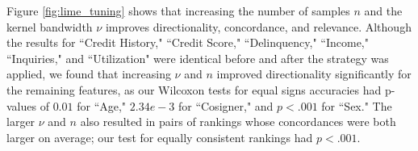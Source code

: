 \documentclass[12pt]{article}  %
\begin{document}
            Figure \ref{fig:lime_tuning} shows that increasing the number of samples $n$ and the kernel bandwidth $\nu$ improves directionality, concordance, and relevance. Although the results for ``Credit History," ``Credit Score," ``Delinquency," ``Income," ``Inquiries," and ``Utilization" were identical before and after the strategy was applied, we found that increasing $\nu$ and $n$ improved directionality  significantly for the remaining features, as our Wilcoxon tests for equal signs accuracies had p-values of $0.01$ for ``Age," $2.34e-3$ for ``Cosigner," and $p<.001$ for ``Sex." The larger $\nu$ and $n$ also resulted in pairs of rankings whose concordances were both larger on average; our test for equally consistent rankings had $p<.001$. %
        
\end{document}
